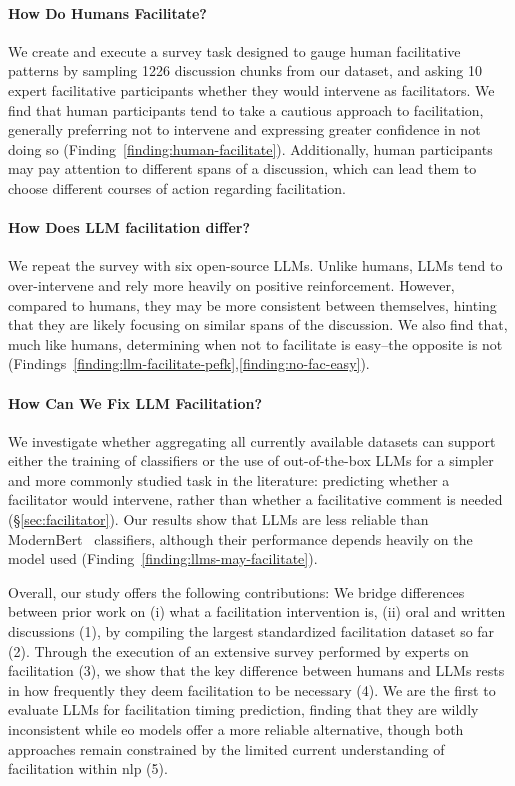 \documentclass[11pt]{article}
\theoremstyle{definition}
\theoremstyle{plain}
\begin{document}
\paragraph{How Do Humans Facilitate?} We create and execute a survey task designed to gauge human facilitative patterns by sampling 1226 discussion chunks from our dataset, and asking 10 expert facilitative participants whether they would intervene as facilitators. We find that human participants tend to take a cautious approach to facilitation, generally preferring not to intervene and expressing greater confidence in not doing so (Finding~\ref{finding:human-facilitate}). Additionally, human participants may pay attention to different spans of a discussion, which can lead them to choose different courses of action regarding facilitation.

\paragraph{How Does LLM facilitation differ?} We repeat the survey with six open-source LLMs. Unlike humans, LLMs tend to over-intervene and rely more heavily on positive reinforcement. However, compared to humans, they may be more consistent between themselves, hinting that they are likely focusing on similar spans of the discussion. We also find that, much like humans, determining when not to facilitate is easy--the opposite is not (Findings~\ref{finding:llm-facilitate-pefk},\ref{finding:no-fac-easy}).

\paragraph{How Can We Fix LLM Facilitation?}
We investigate whether aggregating all currently available datasets can support either the training of classifiers or the use of out-of-the-box LLMs for a simpler and more commonly studied task in the literature: predicting whether a facilitator would intervene, rather than whether a facilitative comment is needed (\S\ref{sec:facilitator}). Our results show that LLMs are less reliable than ModernBert~\citep{warner-etal-2025-smarter} classifiers, although their performance depends heavily on the model used (Finding~\ref{finding:llms-may-facilitate}).

Overall, our study offers the following contributions: We bridge differences between prior work on (i) what a facilitation intervention is, (ii) oral and written discussions (1), by compiling the largest standardized facilitation dataset so far (2). Through the execution of an extensive survey performed by experts on facilitation (3), we show that the key difference between humans and LLMs rests in how frequently they deem facilitation to be necessary (4). We are the first to evaluate LLMs for facilitation timing prediction, finding that they are wildly inconsistent while \ac{eo} models offer a more reliable alternative, though both approaches remain constrained by the limited current understanding of facilitation within \ac{nlp} (5). 
\end{document}
